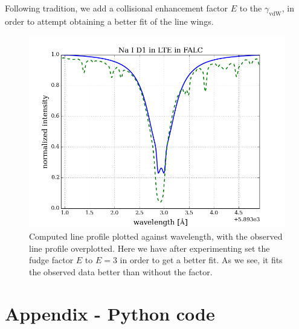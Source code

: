 \documentclass{article}
\begin{document}
Following tradition, we add a collisional enhancement factor $E$ to the $\gamma_{\text{vdW}}$, in order to attempt obtaining a better fit of the line wings.
\begin{figure}[H]
  \centering
  \includegraphics[scale=0.5]{../figures/task3/Na_D1.png}
  \caption{Computed line profile plotted against wavelength, with the observed line profile overplotted. Here we have after experimenting set the fudge factor $E$ to $E=3$ in order to get a better fit. As we see, it fits the observed data better than without the factor.}
\end{figure}
\section{Appendix - Python code}
\end{document}
